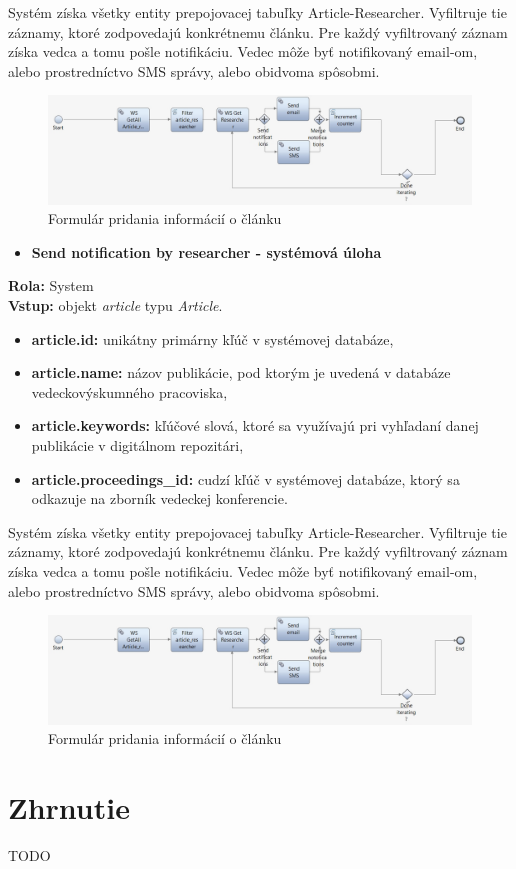 \documentclass[10pt,oneside,slovak,a4paper]{article}
\begin{document}
Systém získa všetky entity prepojovacej tabuľky Article-Researcher. Vyfiltruje tie záznamy, ktoré zodpovedajú konkrétnemu článku. Pre každý vyfiltrovaný záznam získa vedca a tomu pošle notifikáciu. Vedec môže byť notifikovaný email-om, alebo prostredníctvo SMS správy, alebo obidvoma spôsobmi.

\begin{figure} [H]
\centering
\includegraphics[scale=0.4]{diagrams/diagNotification.jpg} 
\caption{Formulár pridania informácií o článku}
\end{figure}

\begin{itemize}
\item \textbf{Send notification by researcher - systémová úloha}
\end{itemize}

\textbf{Rola:} System\\
\textbf{Vstup:} objekt \textit{article} typu \textit{Article}.

\begin{itemize}
\item \textbf{article.id:} unikátny primárny kľúč v systémovej databáze,
\item \textbf{article.name:} názov publikácie, pod ktorým je uvedená v databáze vedeckovýskumného pracoviska,
\item \textbf{article.keywords:} kľúčové slová, ktoré sa využívajú pri vyhľadaní danej publikácie v digitálnom repozitári,
\item \textbf{article.proceedings\_id:} cudzí kľúč v systémovej databáze, ktorý sa odkazuje na zborník vedeckej konferencie.
\end{itemize}

Systém získa všetky entity prepojovacej tabuľky Article-Researcher. Vyfiltruje tie záznamy, ktoré zodpovedajú konkrétnemu článku. Pre každý vyfiltrovaný záznam získa vedca a tomu pošle notifikáciu. Vedec môže byť notifikovaný email-om, alebo prostredníctvo SMS správy, alebo obidvoma spôsobmi.

\begin{figure} [H]
\centering
\includegraphics[scale=0.4]{diagrams/diagNotification.jpg} 
\caption{Formulár pridania informácií o článku}
\end{figure}



\newpage

\section{Zhrnutie}
TODO
\end{document}
